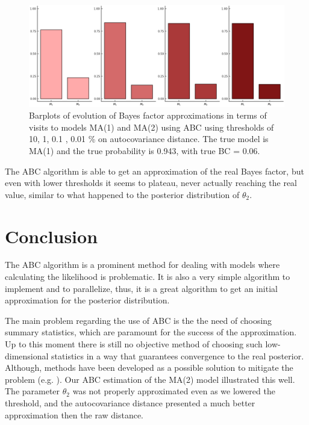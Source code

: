 \documentclass[runningheads]{llncs}
\begin{document}
    \begin{figure}[H]
        \centering
        \includegraphics[width=12cm]{images/ModelChoice_MA1.png}
        \caption{Barplots of evolution of Bayes factor approximations
        in terms of visits to models MA(1) and MA(2) using
        ABC using thresholds of 10, 1, 0.1 , 0.01 \% on autocovariance
        distance. The true model is MA(1) and the true probability
        is 0.943, with true BC = 0.06.
        }
    \end{figure}

The ABC algorithm is able to get an approximation of the real
Bayes factor, but even with lower thresholds it seems to plateau,
never actually reaching the real value, similar to what happened
to the posterior distribution of $\theta_2$.

\section{Conclusion}

The ABC algorithm is a prominent method for dealing with models
where calculating the likelihood is problematic.
It is also a very simple
algorithm to implement and to parallelize, thus, it is
a great algorithm to get an initial approximation
for the posterior distribution.

The main problem
regarding the use of ABC is the
the need of choosing summary statistics, which are paramount for
the success of the approximation. Up to this moment there is still no
objective method of choosing such low-dimensional
statistics in a way that guarantees
convergence to the real posterior. Although, methods have been developed
as a possible solution to mitigate the problem
(e.g. \citet{fearnhead2010constructing}).
Our ABC estimation of the MA(2) model
illustrated this well. The parameter $\theta_2$
was not properly approximated even as we lowered the threshold,
and the autocovariance distance presented a much better approximation
then the raw distance.


%
%
%


%
\end{document}
